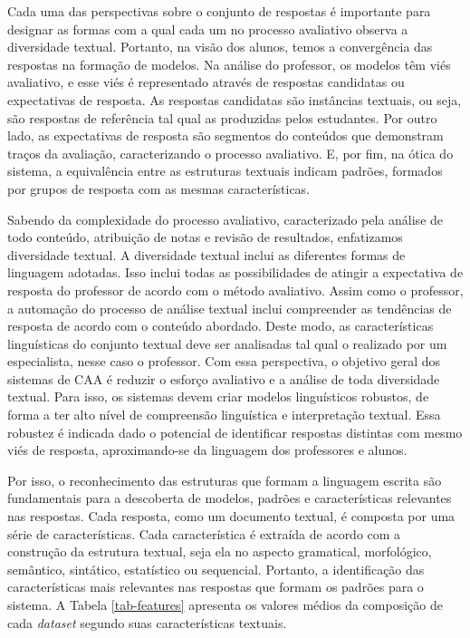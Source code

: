 Cada uma das perspectivas sobre o conjunto de respostas é importante para designar as formas com a qual cada um no processo avaliativo observa a diversidade textual. Portanto, na visão dos alunos, temos a convergência das respostas na formação de modelos. Na análise do professor, os modelos têm viés avaliativo, e esse viés é representado através de respostas candidatas ou expectativas de resposta. As respostas candidatas são instâncias textuais, ou seja, são respostas de referência tal qual as produzidas pelos estudantes. Por outro lado, as expectativas de resposta são segmentos do conteúdos que demonstram traços da avaliação, caracterizando o processo avaliativo. E, por fim, na ótica do sistema, a equivalência entre as estruturas textuais indicam padrões, formados por grupos de resposta com as mesmas características.

Sabendo da complexidade do processo avaliativo, caracterizado pela análise de todo conteúdo, atribuição de notas e revisão de resultados, enfatizamos diversidade textual. A diversidade textual inclui as diferentes formas de linguagem adotadas. Isso inclui todas as possibilidades de atingir a expectativa de resposta do professor de acordo com o método avaliativo. Assim como o professor, a automação do processo de análise textual inclui compreender as tendências de resposta de acordo com o conteúdo abordado. Deste modo, as características linguísticas do conjunto textual deve ser analisadas tal qual o realizado por um especialista, nesse caso o professor. Com essa perspectiva, o objetivo geral dos sistemas de CAA é reduzir o esforço avaliativo e a análise de toda diversidade textual. Para isso, os sistemas devem criar modelos linguísticos robustos, de forma a ter alto nível de compreensão linguística e interpretação textual. Essa robustez é indicada dado o potencial de identificar respostas distintas com mesmo viés de resposta, aproximando-se da linguagem dos professores e alunos.

Por isso, o reconhecimento das estruturas que formam a linguagem escrita são fundamentais para a descoberta de modelos, padrões e características relevantes nas respostas. Cada resposta, como um documento textual, é composta por uma série de características. Cada característica é extraída de acordo com a construção da estrutura textual, seja ela no aspecto gramatical, morfológico, semântico, sintático, estatístico ou sequencial. Portanto, a identificação das características mais relevantes nas respostas que formam os padrões para o sistema. A Tabela \ref{tab-features} apresenta os valores médios da composição de cada \textit{dataset} segundo suas características textuais.

